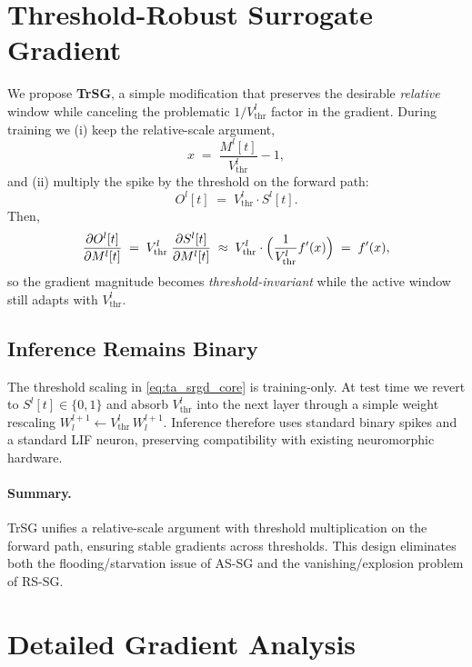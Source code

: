\section{Threshold-Robust Surrogate Gradient}
\label{sec:trsg_method}

We propose \textbf{TrSG}, a simple modification that preserves the desirable \emph{relative} window while canceling the problematic $1/V^{l}_{\text{thr}}$ factor in the gradient. During training we (i) keep the relative-scale argument,
\[
x \;=\; \frac{M^{l}[t]}{V^{l}_{\text{thr}}} - 1,
\]
and (ii) multiply the spike by the threshold on the forward path:
\begin{equation}
\label{eq:ta_srgd_core}
O^{l}[t] \;=\; V^{l}_{\text{thr}}\cdot S^{l}[t].
\end{equation}
Then,
\begin{equation}
\label{eq:ta_srgd_chainrule}
\frac{\partial O^{l}[t]}{\partial M^{l}[t]}
\;=\;
V^{l}_{\text{thr}}\;\frac{\partial S^{l}[t]}{\partial M^{l}[t]}
\;\approx\;
V^{l}_{\text{thr}}\cdot
\Bigl(\frac{1}{V^{l}_{\text{thr}}} f'(x)\Bigr)
\;=\;
f'(x),
\end{equation}
so the gradient magnitude becomes \emph{threshold-invariant} while the active window still adapts with $V^{l}_{\text{thr}}$.

\subsection{Inference Remains Binary}
\label{subsec:trsg_inference}

The threshold scaling in \cref{eq:ta_srgd_core} is training-only. At test time we revert to $S^{l}[t]\in\{0,1\}$ and absorb $V^{l}_{\text{thr}}$ into the next layer through a simple weight rescaling
\(
W^{l+1}_{l}\leftarrow V^{l}_{\text{thr}}\,W^{l+1}_{l}.
\)
Inference therefore uses standard binary spikes and a standard LIF neuron, preserving compatibility with existing neuromorphic hardware.

\paragraph{Summary.}
TrSG unifies a relative-scale argument with threshold multiplication on the forward path, ensuring stable gradients across thresholds. This design eliminates both the flooding/starvation issue of AS-SG and the vanishing/explosion problem of RS-SG.

\section{Detailed Gradient Analysis}
\label{sec:trsg_grad_analysis}

